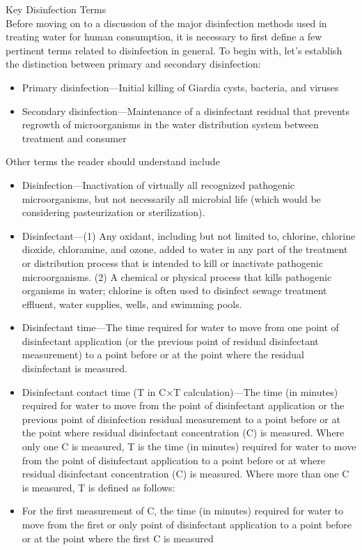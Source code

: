 \documentclass{article}
\begin{document}
Key Disinfection Terms\\
Before moving on to a discussion of the major disinfection methods used in treating water for human consumption, it is necessary to first define a few pertinent terms related to disinfection in general. To begin with, let’s establish the distinction between primary and secondary disinfection:
\begin{itemize}
\item Primary disinfection—Initial killing of Giardia cysts, bacteria, and viruses
\item Secondary disinfection—Maintenance of a disinfectant residual that prevents regrowth of microorganisms in the water distribution system between treatment and consumer
\end{itemize}
Other terms the reader should understand include
\begin{itemize}
\item Disinfection—Inactivation of virtually all recognized pathogenic microorganisms, but not necessarily all microbial life (which would be considering pasteurization or sterilization).
\item Disinfectant—(1) Any oxidant, including but not limited to, chlorine, chlorine dioxide, chloramine, and ozone, added to water in any part of the treatment or distribution process that is intended to kill or inactivate pathogenic microorganisms. (2) A chemical or physical process that kills pathogenic organisms in water; chlorine is often used to disinfect sewage treatment effluent, water supplies, wells, and swimming pools.
\item Disinfectant time—The time required for water to move from one point of disinfectant application (or the previous point of residual disinfectant measurement) to a point before or at the point where the residual disinfectant is measured.
\item Disinfectant contact time (T in C×T calculation)—The time (in minutes) required for water to move from the point of disinfectant application or the previous point of disinfection residual measurement to a point before or at
the point where residual disinfectant concentration (C) is measured. Where only one C is measured, T is the time (in minutes) required for water to move from the point of disinfectant application to a point before or at where residual disinfectant concentration (C) is measured. Where more than one C is measured, T is defined as follows:
\item For the first measurement of C, the time (in minutes) required for water to move from the first or only point of disinfectant application to a point before or at the point where the first C is measured

\end{itemize}
\end{document}
